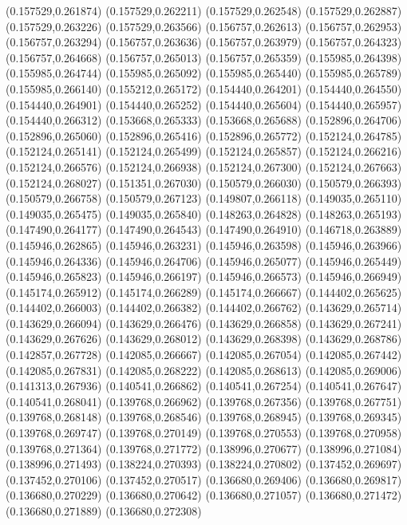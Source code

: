 (0.157529,0.261874)
(0.157529,0.262211)
(0.157529,0.262548)
(0.157529,0.262887)
(0.157529,0.263226)
(0.157529,0.263566)
(0.156757,0.262613)
(0.156757,0.262953)
(0.156757,0.263294)
(0.156757,0.263636)
(0.156757,0.263979)
(0.156757,0.264323)
(0.156757,0.264668)
(0.156757,0.265013)
(0.156757,0.265359)
(0.155985,0.264398)
(0.155985,0.264744)
(0.155985,0.265092)
(0.155985,0.265440)
(0.155985,0.265789)
(0.155985,0.266140)
(0.155212,0.265172)
(0.154440,0.264201)
(0.154440,0.264550)
(0.154440,0.264901)
(0.154440,0.265252)
(0.154440,0.265604)
(0.154440,0.265957)
(0.154440,0.266312)
(0.153668,0.265333)
(0.153668,0.265688)
(0.152896,0.264706)
(0.152896,0.265060)
(0.152896,0.265416)
(0.152896,0.265772)
(0.152124,0.264785)
(0.152124,0.265141)
(0.152124,0.265499)
(0.152124,0.265857)
(0.152124,0.266216)
(0.152124,0.266576)
(0.152124,0.266938)
(0.152124,0.267300)
(0.152124,0.267663)
(0.152124,0.268027)
(0.151351,0.267030)
(0.150579,0.266030)
(0.150579,0.266393)
(0.150579,0.266758)
(0.150579,0.267123)
(0.149807,0.266118)
(0.149035,0.265110)
(0.149035,0.265475)
(0.149035,0.265840)
(0.148263,0.264828)
(0.148263,0.265193)
(0.147490,0.264177)
(0.147490,0.264543)
(0.147490,0.264910)
(0.146718,0.263889)
(0.145946,0.262865)
(0.145946,0.263231)
(0.145946,0.263598)
(0.145946,0.263966)
(0.145946,0.264336)
(0.145946,0.264706)
(0.145946,0.265077)
(0.145946,0.265449)
(0.145946,0.265823)
(0.145946,0.266197)
(0.145946,0.266573)
(0.145946,0.266949)
(0.145174,0.265912)
(0.145174,0.266289)
(0.145174,0.266667)
(0.144402,0.265625)
(0.144402,0.266003)
(0.144402,0.266382)
(0.144402,0.266762)
(0.143629,0.265714)
(0.143629,0.266094)
(0.143629,0.266476)
(0.143629,0.266858)
(0.143629,0.267241)
(0.143629,0.267626)
(0.143629,0.268012)
(0.143629,0.268398)
(0.143629,0.268786)
(0.142857,0.267728)
(0.142085,0.266667)
(0.142085,0.267054)
(0.142085,0.267442)
(0.142085,0.267831)
(0.142085,0.268222)
(0.142085,0.268613)
(0.142085,0.269006)
(0.141313,0.267936)
(0.140541,0.266862)
(0.140541,0.267254)
(0.140541,0.267647)
(0.140541,0.268041)
(0.139768,0.266962)
(0.139768,0.267356)
(0.139768,0.267751)
(0.139768,0.268148)
(0.139768,0.268546)
(0.139768,0.268945)
(0.139768,0.269345)
(0.139768,0.269747)
(0.139768,0.270149)
(0.139768,0.270553)
(0.139768,0.270958)
(0.139768,0.271364)
(0.139768,0.271772)
(0.138996,0.270677)
(0.138996,0.271084)
(0.138996,0.271493)
(0.138224,0.270393)
(0.138224,0.270802)
(0.137452,0.269697)
(0.137452,0.270106)
(0.137452,0.270517)
(0.136680,0.269406)
(0.136680,0.269817)
(0.136680,0.270229)
(0.136680,0.270642)
(0.136680,0.271057)
(0.136680,0.271472)
(0.136680,0.271889)
(0.136680,0.272308)
